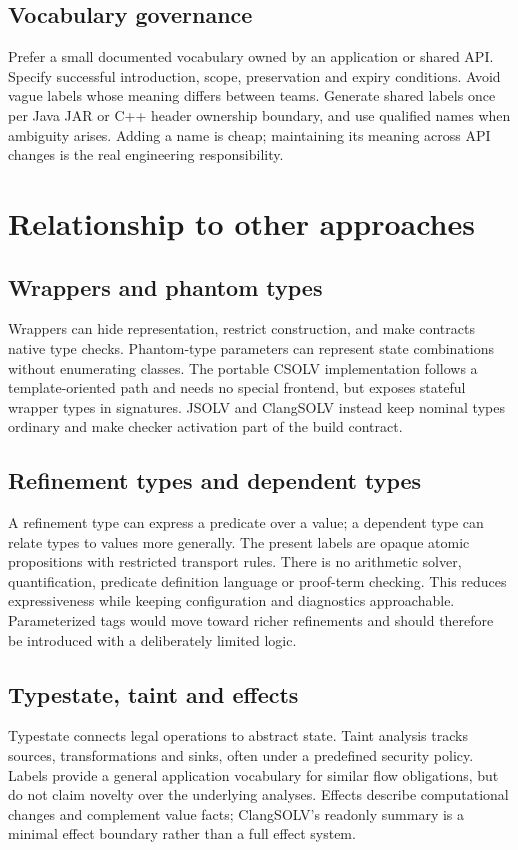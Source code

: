 \documentclass[11pt]{article}
\begin{document}
\subsection{Vocabulary governance}
Prefer a small documented vocabulary owned by an application or shared API.
Specify successful introduction, scope, preservation and expiry conditions.
Avoid vague labels whose meaning differs between teams. Generate shared labels
once per Java JAR or C++ header ownership boundary, and use qualified names
when ambiguity arises. Adding a name is cheap; maintaining its meaning across
API changes is the real engineering responsibility.

\section{Relationship to other approaches}
\subsection{Wrappers and phantom types}
Wrappers can hide representation, restrict construction, and make contracts
native type checks. Phantom-type parameters can represent state combinations
without enumerating classes. The portable CSOLV implementation follows a
template-oriented path and needs no special frontend, but exposes stateful
wrapper types in signatures. JSOLV and ClangSOLV instead keep nominal types
ordinary and make checker activation part of the build contract.

\subsection{Refinement types and dependent types}
A refinement type can express a predicate over a value; a dependent type can
relate types to values more generally. The present labels are opaque atomic
propositions with restricted transport rules. There is no arithmetic solver,
quantification, predicate definition language or proof-term checking. This
reduces expressiveness while keeping configuration and diagnostics approachable.
Parameterized tags would move toward richer refinements and should therefore
be introduced with a deliberately limited logic.

\subsection{Typestate, taint and effects}
Typestate connects legal operations to abstract state. Taint analysis tracks
sources, transformations and sinks, often under a predefined security policy.
Labels provide a general application vocabulary for similar flow obligations,
but do not claim novelty over the underlying analyses. Effects describe
computational changes and complement value facts; ClangSOLV's readonly summary
is a minimal effect boundary rather than a full effect system.
\end{document}
